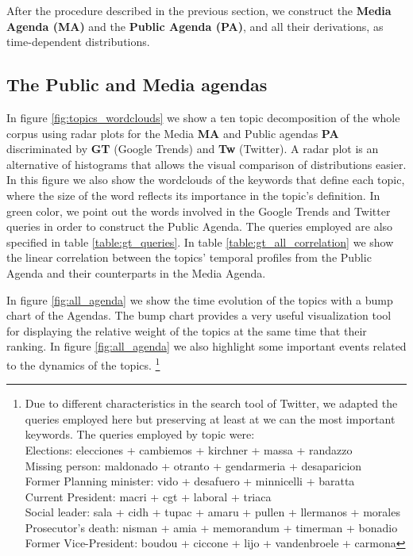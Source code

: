 \documentclass[a4paper, 12pt]{article}
\begin{document}
\par After the procedure described in the previous section, we construct the \textbf{Media Agenda (MA)} and the \textbf{Public Agenda (PA)}, and all their derivations, as time-dependent distributions. 

\subsection{The Public and Media agendas}

\par In figure \ref{fig:topics_wordclouds} we show a ten topic decomposition of the whole corpus using radar plots for the Media \textbf{MA} and Public agendas \textbf{PA} discriminated by \textbf{GT} (Google Trends) and \textbf{Tw} (Twitter). A radar plot is an alternative of histograms that allows the visual comparison of distributions easier.
In this figure we also show the wordclouds of the keywords that define each topic, where the size of the word reflects its importance in the topic's definition. In green color, we point out the words involved in the Google Trends and Twitter queries in order to construct the Public Agenda. The queries employed are also specified in table \ref{table:gt_queries}. In table \ref{table:gt_all_correlation} we show the linear correlation between the topics' temporal profiles from the Public Agenda and their counterparts in the Media Agenda.

\par In figure \ref{fig:all_agenda} we show the time evolution of the topics with a bump chart of the Agendas. The bump chart provides  a very useful visualization tool for displaying the relative weight of the topics at the same time that their ranking. In figure \ref{fig:all_agenda} we also highlight some important events related to the dynamics of the topics. \footnote{Due to different characteristics in the search tool of Twitter, we adapted the queries employed here but preserving at least at we can the most important keywords. The queries employed by topic were: \\
Elections: elecciones + cambiemos + kirchner + massa + randazzo \\
Missing person: maldonado + otranto + gendarmeria + desaparicion \\
Former Planning minister: vido + desafuero + minnicelli + baratta \\
Current President: macri + cgt + laboral +  triaca \\
Social leader:  sala + cidh + tupac + amaru + pullen + llermanos + morales \\
Prosecutor’s death: nisman + amia + memorandum + timerman +  bonadio \\
Former Vice-President:  boudou + ciccone +  lijo + vandenbroele + carmona
}
\end{document}
